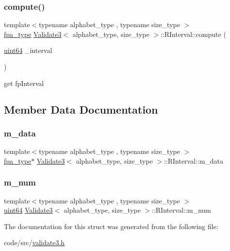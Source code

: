 \subsubsection{\texorpdfstring{compute()}{compute()}}
{\footnotesize\ttfamily template$<$typename alphabet\+\_\+type , typename size\+\_\+type $>$ \\
\hyperlink{common_8h_a7fdaf8b9b3d2f6ae6b10597a8d3f96ee}{fpa\+\_\+type} \hyperlink{class_validate3}{Validate3}$<$ alphabet\+\_\+type, size\+\_\+type $>$\+::R\+Interval\+::compute (\begin{DoxyParamCaption}\item[{\hyperlink{types_8h_a60e8696a4678cd348e991a1f172e53f7}{uint64}}]{\+\_\+interval }\end{DoxyParamCaption})\hspace{0.3cm}{\ttfamily [inline]}}



get fp\+Interval 



\subsection{Member Data Documentation}
\mbox{\label{struct_validate3_1_1_r_interval_a137b07cbcfdf9b356285f8389bb9bc76}} 
\subsubsection{\texorpdfstring{m\+\_\+data}{m\_data}}
{\footnotesize\ttfamily template$<$typename alphabet\+\_\+type , typename size\+\_\+type $>$ \\
\hyperlink{common_8h_a7fdaf8b9b3d2f6ae6b10597a8d3f96ee}{fpa\+\_\+type}$\ast$ \hyperlink{class_validate3}{Validate3}$<$ alphabet\+\_\+type, size\+\_\+type $>$\+::R\+Interval\+::m\+\_\+data}

\mbox{\label{struct_validate3_1_1_r_interval_a7d49d9eae5b1e584d29ca795472ea921}} 
\subsubsection{\texorpdfstring{m\+\_\+num}{m\_num}}
{\footnotesize\ttfamily template$<$typename alphabet\+\_\+type , typename size\+\_\+type $>$ \\
\hyperlink{types_8h_a60e8696a4678cd348e991a1f172e53f7}{uint64} \hyperlink{class_validate3}{Validate3}$<$ alphabet\+\_\+type, size\+\_\+type $>$\+::R\+Interval\+::m\+\_\+num}



The documentation for this struct was generated from the following file\+:\begin{DoxyCompactItemize}
\item 
code/src/\hyperlink{validate3_8h}{validate3.\+h}\end{DoxyCompactItemize}
